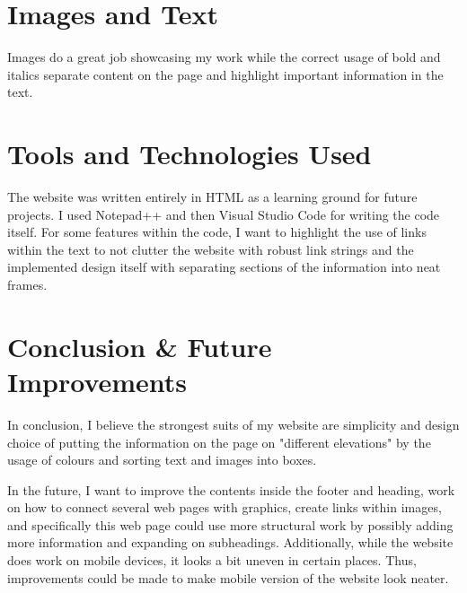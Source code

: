 \documentclass[twoside]{article}
\begin{document}
\section*{Images and Text}
Images do a great job showcasing my work while the correct usage of bold and italics separate content on the page and highlight important information in the text.

\section*{Tools and Technologies Used}
\noindent The website was written entirely in HTML as a learning ground for future projects. I used Notepad++ and then Visual Studio Code for writing the code itself. For some features within the code, I want to highlight the use of links within the text to not clutter the website with robust link strings and the implemented design itself with separating sections of the information into neat frames.

\section*{Conclusion \& Future Improvements}
In conclusion, I believe the strongest suits of my website are simplicity and design choice of putting the information on the page on "different elevations" by the usage of colours and sorting text and images into boxes. 

\vspace{1em}

\noindent In the future, I want to improve the contents inside the footer and heading, work on how to connect several web pages with graphics, create links within images, and specifically this web page could use more structural work by possibly adding more information and expanding on subheadings. Additionally, while the website does work on mobile devices, it looks a bit uneven in certain places. Thus, improvements could be made to make mobile version of the website look neater.
\end{document}
